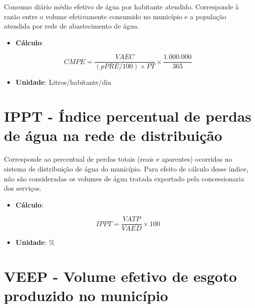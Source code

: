 \documentclass[]{book}
\providecommand{\tightlist}{%
  \setlength{\itemsep}{0pt}\setlength{\parskip}{0pt}}
\begin{document}
Consumo diário médio efetivo de água por habitante atendido. Corresponde à razão entre o volume efetivamente consumido no município e a população atendida por rede de abastecimento de água.

\begin{itemize}
\tightlist
\item
  \textbf{Cálculo}:
\end{itemize}

\[
CMPE = \frac{VAEC}{(pPRE/100)\times PT} \times \frac{1.000.000}{365}
\]

\begin{itemize}
\tightlist
\item
  \textbf{Unidade}: Litros/habitante/dia
\end{itemize}

\hypertarget{ippt---uxedndice-percentual-de-perdas-de-uxe1gua-na-rede-de-distribuiuxe7uxe3o}{%
\section*{IPPT - Índice percentual de perdas de água na rede de distribuição}\label{ippt---uxedndice-percentual-de-perdas-de-uxe1gua-na-rede-de-distribuiuxe7uxe3o}}

Corresponde ao percentual de perdas totais (reais e aparentes) ocorridas no sistema de distribuição de água do município. Para efeito de cálculo desse índice, não são consideradas os volumes de água tratada exportado pela concessionaria dos serviços.

\begin{itemize}
\tightlist
\item
  \textbf{Cálculo}:
\end{itemize}

\[
IPPT = \frac{VATP}{VAED} \times 100
\]

\begin{itemize}
\tightlist
\item
  \textbf{Unidade}: \%
\end{itemize}

\hypertarget{veep---volume-efetivo-de-esgoto-produzido-no-municuxedpio}{%
\section*{VEEP - Volume efetivo de esgoto produzido no município}\label{veep---volume-efetivo-de-esgoto-produzido-no-municuxedpio}}
\end{document}
